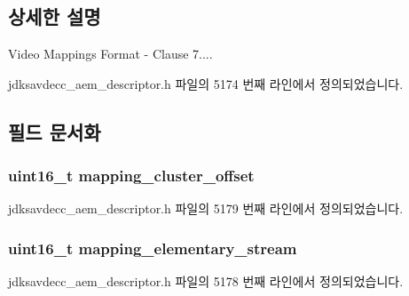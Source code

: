 \subsection{상세한 설명}
Video Mappings Format -\/ Clause 7.... 

jdksavdecc\+\_\+aem\+\_\+descriptor.\+h 파일의 5174 번째 라인에서 정의되었습니다.



\subsection{필드 문서화}
\subsubsection[{\texorpdfstring{mapping\+\_\+cluster\+\_\+offset}{mapping_cluster_offset}}]{\setlength{\rightskip}{0pt plus 5cm}uint16\+\_\+t mapping\+\_\+cluster\+\_\+offset}\hypertarget{structjdksavdecc__video__mappings__format_ab57e85d38dacb8e4e841cf9f1fbd7a36}{}\label{structjdksavdecc__video__mappings__format_ab57e85d38dacb8e4e841cf9f1fbd7a36}


jdksavdecc\+\_\+aem\+\_\+descriptor.\+h 파일의 5179 번째 라인에서 정의되었습니다.

\subsubsection[{\texorpdfstring{mapping\+\_\+elementary\+\_\+stream}{mapping_elementary_stream}}]{\setlength{\rightskip}{0pt plus 5cm}uint16\+\_\+t mapping\+\_\+elementary\+\_\+stream}\hypertarget{structjdksavdecc__video__mappings__format_a17b2b1b6c4e5fe6a591563df87fc2cd4}{}\label{structjdksavdecc__video__mappings__format_a17b2b1b6c4e5fe6a591563df87fc2cd4}


jdksavdecc\+\_\+aem\+\_\+descriptor.\+h 파일의 5178 번째 라인에서 정의되었습니다.

